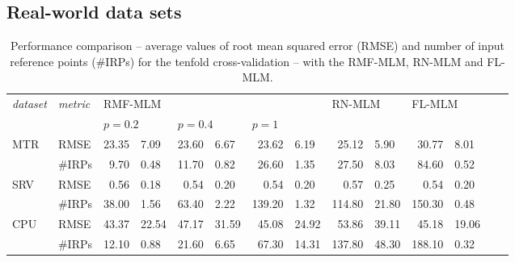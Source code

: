 \documentclass[final]{beamer}
\begin{document}
\begin{frame}[t]
\begin{multicols}{3}
\subsection{Real-world data sets}
\begin{table}[!ht]
\caption{Performance comparison -- average values of root mean squared error (RMSE) and number of input reference points (\#IRPs) for the tenfold cross-validation -- with the RMF-MLM, RN-MLM and FL-MLM.}\label{tab:results}
\begin{center}
\begin{tabular}{ll r@{${}\pm{}$}l r@{${}\pm{}$}l r@{${}\pm{}$}l r@{${}\pm{}$}l r@{${}\pm{}$}l r@{${}\pm{}$}l}  \toprule
\emph{dataset} & \emph{metric}    & \multicolumn{6}{l}{RMF-MLM}   & \multicolumn{2}{l}{RN-MLM} &  \multicolumn{2}{l}{FL-MLM} \\ \cmidrule{3-8}

~& ~    &  \multicolumn{2}{l}{$p = 0.2$} & \multicolumn{2}{l}{$p = 0.4$} & \multicolumn{2}{l}{$p= 1$}   & \multicolumn{2}{l}{~} &  \multicolumn{2}{l}{~} \\ \midrule

\multirow{2}{*}{MTR}  & RMSE    &     23.35 &     7.09 &     23.60 &     6.67 &     23.62 &     6.19 &     25.12 &     5.90 &     30.77 &     8.01 \\ 
                      & \#IRPs  &      9.70 &     0.48 &     11.70 &     0.82 &     26.60 &     1.35 &     27.50 &     8.03 &     84.60 &     0.52 \\ \midrule

\multirow{2}{*}{SRV}  & RMSE    &      0.56 &     0.18 &      0.54 &     0.20 &      0.54 &     0.20 &      0.57 &     0.25 &      0.54 &     0.20 \\ 
                      & \#IRPs  &     38.00 &     1.56 &     63.40 &     2.22 &    139.20 &     1.32 &    114.80 &    21.80 &    150.30 &     0.48 \\ \midrule

\multirow{2}{*}{CPU}  & RMSE    &     43.37 &    22.54 &     47.17 &    31.59 &     45.08 &    24.92 &     53.86 &    39.11 &     45.18 &    19.06 \\ 
                      & \#IRPs  &     12.10 &     0.88 &     21.60 &     6.65 &     67.30 &    14.31 &    137.80 &    48.30 &    188.10 &     0.32 \\ \midrule


\end{tabular}
\end{center}
\end{table}
\end{multicols}
\end{frame}
\end{document}
